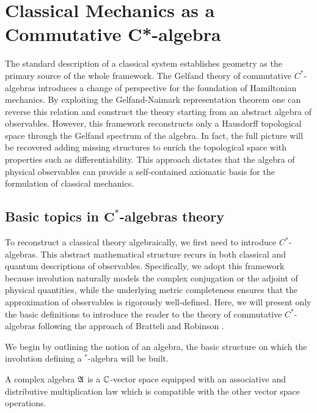 \section{Classical Mechanics as a Commutative C*-algebra}\label{sec:classical-alg-rec}
	The standard description of a classical system establishes geometry as the primary source of the whole framework. The Gelfand theory of commutative $C^*$-algebras introduces a change of perspective for the foundation of Hamiltonian mechanics. By exploiting the Gelfand-Naimark representation theorem one can reverse this relation and construct the theory starting from an abstract algebra of observables. However, this framework reconstructs only a Hausdorff topological space through the Gelfand spectrum of the algebra. In fact, the full picture will be recovered adding missing structures to enrich the topological space with properties such as differentiability. This approach dictates that the algebra of physical observables can provide a self-contained axiomatic basis for the formulation of classical mechanics.
	
	\subsection*{Basic topics in $\mathbf{C^*}$-algebras theory}
	To reconstruct a classical theory algebraically, we first need to introduce $C^*$-algebras. This abstract mathematical structure recurs in both classical and quantum descriptions of observables. Specifically, we adopt this framework because involution naturally models the complex conjugation or the adjoint of physical quantities, while the underlying metric completeness ensures that the approximation of observables is rigorously well-defined. Here, we will present only the basic definitions to introduce the reader to the theory of commutative $C^*$-algebras following the approach of Bratteli and Robinson \cite[Chapter 2]{bratteliOperatorAlgebrasQuantum}.
	
	\noindent We begin by outlining the notion of an algebra, the basic structure on which the involution defining a $^*$-algebra will be built.
	
	\begin{definition}[Algebra]\label{def:algebra}
		A complex algebra $\mathfrak{A}$ is a $\mathbb{C}$-vector space equipped with an associative and distributive multiplication law which is compatible with the other vector space operations.
	\end{definition}
	
